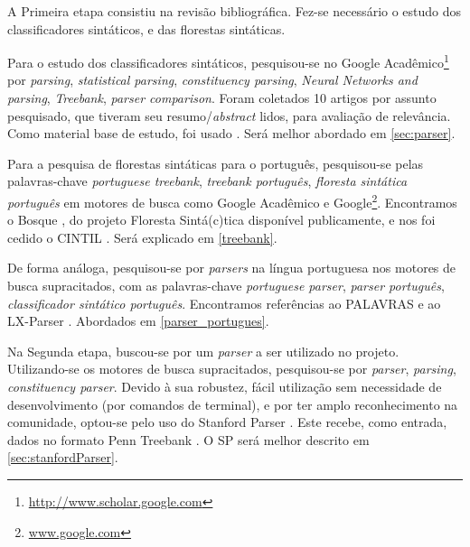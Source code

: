 A Primeira etapa consistiu na revisão bibliográfica. Fez-se necessário o estudo dos classificadores sintáticos, e das florestas sintáticas. 

Para o estudo dos classificadores sintáticos, pesquisou-se no Google Acadêmico\footnote{\url{http://www.scholar.google.com}} por \textit{parsing}, \textit{statistical parsing}, \textit{constituency parsing}, \textit{Neural Networks and parsing}, \textit{Treebank}, \textit{parser comparison}. Foram coletados 10 artigos por assunto pesquisado, que tiveram seu resumo/\textit{abstract} lidos, para avaliação de relevância. Como material base de estudo, foi usado  \cite{Manning1999FoundationsNLP}. Será melhor abordado em \ref{sec:parser}.

Para a pesquisa de florestas sintáticas para o português, pesquisou-se pelas palavras-chave \textit{portuguese treebank}, \textit{treebank português}, \textit{floresta sintática português} em motores de busca como Google Acadêmico e Google\footnote{\url{www.google.com}}. Encontramos o Bosque \cite{bick2008FlorestaSintatica}, do projeto Floresta Sintá(c)tica disponível publicamente, e nos foi cedido o CINTIL \cite{cintil_handbook}. Será explicado em \ref{treebank}.

De forma análoga, pesquisou-se por \textit{parsers} na língua portuguesa nos motores de busca supracitados, com as palavras-chave \textit{portuguese parser}, \textit{parser português}, \textit{classificador sintático português}. Encontramos referências ao PALAVRAS \cite{bick2000palavras} e ao LX-Parser \cite{siteLxParser}. Abordados em \ref{parser_portugues}.

Na Segunda etapa, buscou-se por um \textit{parser} a ser utilizado no projeto. Utilizando-se os motores de busca supracitados, pesquisou-se por \textit{parser}, \textit{parsing}, \textit{constituency parser}. Devido à sua robustez, fácil utilização sem necessidade de desenvolvimento (por comandos de terminal), e por ter amplo reconhecimento na comunidade, optou-se pelo uso do Stanford Parser \cite{fastAccurate}. Este recebe, como entrada, dados no formato Penn Treebank \cite{buildingPTB}. O SP será melhor descrito em \ref{sec:stanfordParser}.


